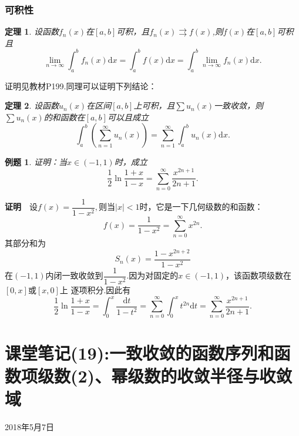 \documentclass[UTF8]{article}
\newcommand{\dx}{\mathrm{d}x}
\newcommand{\zm}{\textbf{证明}$\quad$}
\newtheorem{thm}{\hspace{2em}定理}[section]
\newtheorem{exa}{\hspace{2em}例题}[section]
\begin{document}
\subsubsection{可积性}
\begin{thm}
  设函数$f_n(x)$在$[a,b]$可积，且$f_n(x)\rightrightarrows f(x)$,则$f(x)$在$[a,b]$可积且
  $$\lim_{n\to\infty}\int_a^bf_n(x)\dx=\int_a^bf(x)\dx=\int_a^b\lim_{n\to\infty}f_n(x)\dx.$$
\end{thm}
证明见教材P199.同理可以证明下列结论：
\begin{thm}
  设函数$u_n(x)$在区间$[a,b]$上可积，且$\sum u_n(x)$一致收敛，则$\sum u_n(x)$的和函数在$[a,b]$可以且成立
  $$\int_a^b\left(\sum_{n=1}^\infty u_n(x)\right)=\sum_{n=1}^\infty \int_a^bu_n(x)\dx.$$
\end{thm}
\begin{exa}
  证明：当$x\in(-1,1)$时，成立
  $$\frac{1}{2}\ln\frac{1+x}{1-x}=\sum_{n=0}^\infty\frac{x^{2n+1}}{2n+1}.$$
\end{exa}
\zm 设$f(x)=\dfrac{1}{1-x^2},$则当$|x|<1$时，它是一下几何级数的和函数：
$$f(x)=\frac{1}{1-x^2}=\sum_{n=0}^\infty x^{2n}.$$
其部分和为
$$S_n(x)=\frac{1-x^{2n+2}}{1-x^2}$$
在$(-1,1)$内闭一致收敛到$\dfrac{1}{1-x^2}.$因为对固定的$x\in(-1,1)$，该函数项级数在$[0,x]$或$[x,0]$上
逐项积分.因此有
$$\frac{1}{2}\ln\frac{1+x}{1-x}=\int_0^x\frac{\mathrm{d}t}{1-t^2}=\sum_{n=0}^\infty\int_0^x t^{2n}
\mathrm{d}t=\sum_{n=0}^\infty\frac{x^{2n+1}}{2n+1}.$$

\clearpage
\section{课堂笔记(19):一致收敛的函数序列和函数项级数(2)、幂级数的收敛半径与收敛域}
\begin{center}
  2018年5月7日
\end{center}
\end{document}
